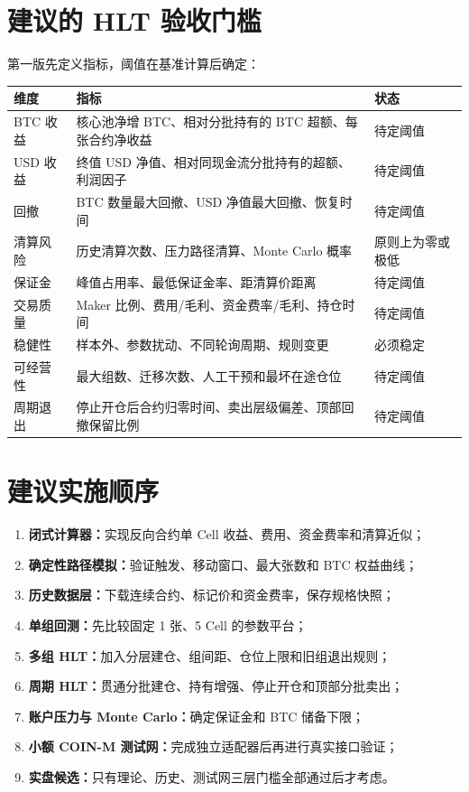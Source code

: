 \documentclass[11pt,a4paper,fontset=none]{ctexart}
\begin{document}
\section{建议的 HLT 验收门槛}

第一版先定义指标，阈值在基准计算后确定：

\begin{longtable}{p{3.6cm}p{6.4cm}p{3.8cm}}
  \toprule
  维度 & 指标 & 状态 \\
  \midrule
  \endhead
  BTC 收益 & 核心池净增 BTC、相对分批持有的 BTC 超额、每张合约净收益 & 待定阈值 \\
  USD 收益 & 终值 USD 净值、相对同现金流分批持有的超额、利润因子 & 待定阈值 \\
  回撤 & BTC 数量最大回撤、USD 净值最大回撤、恢复时间 & 待定阈值 \\
  清算风险 & 历史清算次数、压力路径清算、Monte Carlo 概率 & 原则上为零或极低 \\
  保证金 & 峰值占用率、最低保证金率、距清算价距离 & 待定阈值 \\
  交易质量 & Maker 比例、费用/毛利、资金费率/毛利、持仓时间 & 待定阈值 \\
  稳健性 & 样本外、参数扰动、不同轮询周期、规则变更 & 必须稳定 \\
  可经营性 & 最大组数、迁移次数、人工干预和最坏在途仓位 & 待定阈值 \\
  周期退出 & 停止开仓后合约归零时间、卖出层级偏差、顶部回撤保留比例 & 待定阈值 \\
  \bottomrule
\end{longtable}

\section{建议实施顺序}

\begin{enumerate}
  \item \textbf{闭式计算器：}实现反向合约单 Cell 收益、费用、资金费率和清算近似；
  \item \textbf{确定性路径模拟：}验证触发、移动窗口、最大张数和 BTC 权益曲线；
  \item \textbf{历史数据层：}下载连续合约、标记价和资金费率，保存规格快照；
  \item \textbf{单组回测：}先比较固定 1 张、5 Cell 的参数平台；
  \item \textbf{多组 HLT：}加入分层建仓、组间距、仓位上限和旧组退出规则；
  \item \textbf{周期 HLT：}贯通分批建仓、持有增强、停止开仓和顶部分批卖出；
  \item \textbf{账户压力与 Monte Carlo：}确定保证金和 BTC 储备下限；
  \item \textbf{小额 COIN-M 测试网：}完成独立适配器后再进行真实接口验证；
  \item \textbf{实盘候选：}只有理论、历史、测试网三层门槛全部通过后才考虑。
\end{enumerate}
\end{document}
